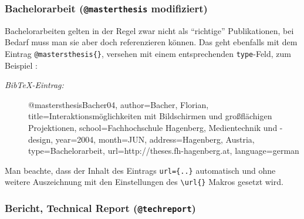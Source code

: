 

\subsubsection{Bachelorarbeit (\texttt{@masterthesis} modifiziert)}

Bachelorarbeiten gelten in der Regel zwar nicht als "`richtige"' Publikationen, bei Bedarf muss man sie aber doch referenzieren können. Das geht ebenfalls mit dem Eintrag \verb!@mastersthesis{}!, versehen mit einem entsprechenden \verb!type!-Feld, zum Beispiel \cite{Bacher04}:
%
\begin{description}
\item[\it BibTeX-Eintrag:] \mbox{}\par
%
\begin{GenericCode}
@mastersthesis{Bacher04,
  author={Bacher, Florian},
  title={Interaktionsmöglichkeiten mit Bildschirmen 
         und gro\ss flächigen Projektionen},
  school={Fachhochschule Hagenberg, Medientechnik und -design},
  year={2004},
  month=JUN,
  address={Hagenberg, Austria},
  type={Bachelorarbeit},
  url={http://theses.fh-hagenberg.at},
  language={german}
}
\end{GenericCode}
\end{description}
%
Man beachte, dass der Inhalt des Eintrags \verb!url={..}! automatisch und ohne weitere Auszeichnung mit den Einstellungen des \verb!\url{}! Makros gesetzt wird.

\subsubsection{Bericht, Technical Report (\texttt{@techreport})}
\nocite{Beeler48}

